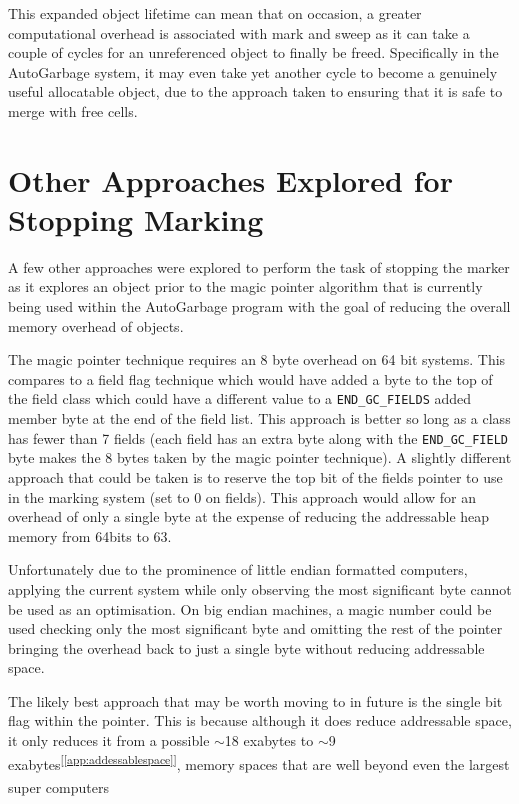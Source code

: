 \documentclass[11pt]{article}
\begin{document}
This expanded object lifetime can mean that on occasion, a greater computational overhead is associated with
mark and sweep as it can take a couple of cycles for an unreferenced object to finally be freed. Specifically in the AutoGarbage
system, it may even take yet another cycle to become a genuinely useful allocatable object, due to the approach taken to ensuring
that it is safe to merge with free cells.

\newpage
\appendix
\section{Other Approaches Explored for Stopping Marking}
\label{app:exploredmarkingapproaches}
A few other approaches were explored to perform the task of stopping the marker as it explores an object prior to the magic
pointer algorithm that is currently being used within the AutoGarbage program with the goal of reducing the overall memory overhead
of objects. 

The magic pointer technique requires an 8 byte overhead on 64 bit systems. This compares to a field flag technique which would
have added a byte to the top of the field class which could have a different value to a \texttt{END\_GC\_FIELDS} added member byte 
at the end of the field list. This approach is better so long as a class has fewer than 7 fields (each field has an extra byte 
along with the \texttt{END\_GC\_FIELD} byte makes the 8 bytes taken by the magic pointer technique).
A slightly different approach that could be taken is to reserve the top bit of the fields pointer to use in the marking system
(set to 0 on fields). This approach would allow for an overhead of only a single byte at the expense of reducing the addressable 
heap memory from 64bits to 63.

Unfortunately due to the prominence of little endian formatted computers, applying the current system while only observing the most
significant byte cannot be used as an optimisation. On big endian machines, a magic number could be used checking only the most
significant byte and omitting the rest of the pointer bringing the overhead back to just a single byte without reducing
addressable space.

The likely best approach that may be worth moving to in future is the single bit flag within the pointer. This is because although
it does reduce addressable space, it only reduces 
it from a possible $\sim$18 exabytes to $\sim$9 exabytes\textsuperscript{[\ref{app:addessablespace}]},
memory spaces that are well beyond even the largest super computers\textsuperscript{\cite{bib:summitsupercomputer}}
\end{document}
